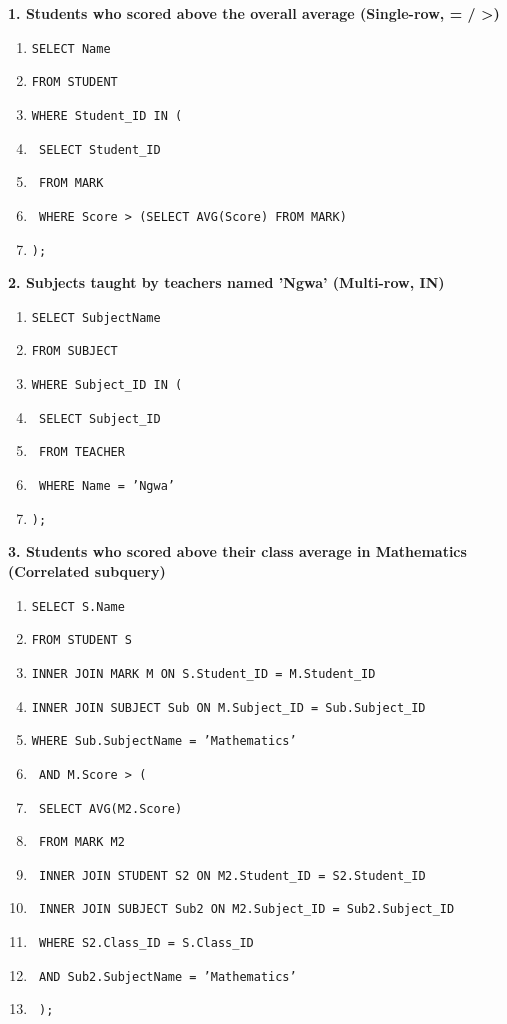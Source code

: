 \documentclass[11pt]{article}
\begin{document}
\begin{exemplebox}
\textbf{1. Students who scored above the overall average (Single-row, = / >)}
\begin{enumerate}
\item \texttt{SELECT Name}
\item \texttt{FROM STUDENT}
\item \texttt{WHERE Student\_ID IN (}
\item \texttt{    SELECT Student\_ID}
\item \texttt{    FROM MARK}
\item \texttt{    WHERE Score > (SELECT AVG(Score) FROM MARK)}
\item \texttt{);}
\end{enumerate}

\textbf{2. Subjects taught by teachers named 'Ngwa' (Multi-row, IN)}
\begin{enumerate}
\item \texttt{SELECT SubjectName}
\item \texttt{FROM SUBJECT}
\item \texttt{WHERE Subject\_ID IN (}
\item \texttt{    SELECT Subject\_ID}
\item \texttt{    FROM TEACHER}
\item \texttt{    WHERE Name = 'Ngwa'}
\item \texttt{);}
\end{enumerate}

\textbf{3. Students who scored above their class average in Mathematics (Correlated subquery)}
\begin{enumerate}
\item \texttt{SELECT S.Name}
\item \texttt{FROM STUDENT S}
\item \texttt{INNER JOIN MARK M ON S.Student\_ID = M.Student\_ID}
\item \texttt{INNER JOIN SUBJECT Sub ON M.Subject\_ID = Sub.Subject\_ID}
\item \texttt{WHERE Sub.SubjectName = 'Mathematics'}
\item \texttt{  AND M.Score > (}
\item \texttt{      SELECT AVG(M2.Score)}
\item \texttt{      FROM MARK M2}
\item \texttt{      INNER JOIN STUDENT S2 ON M2.Student\_ID = S2.Student\_ID}
\item \texttt{      INNER JOIN SUBJECT Sub2 ON M2.Subject\_ID = Sub2.Subject\_ID}
\item \texttt{      WHERE S2.Class\_ID = S.Class\_ID}
\item \texttt{        AND Sub2.SubjectName = 'Mathematics'}
\item \texttt{  );}
\end{enumerate}
\end{exemplebox}
\end{document}
